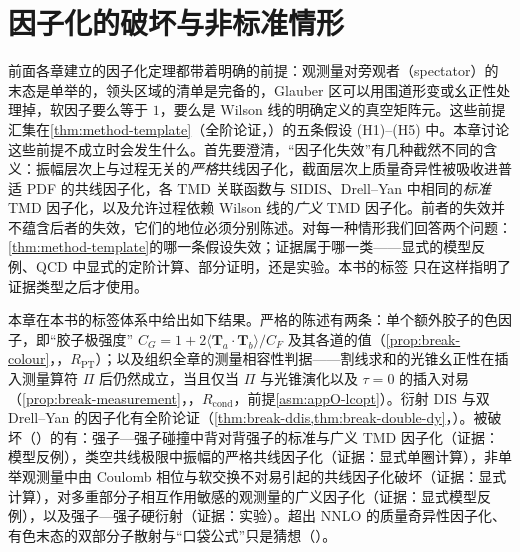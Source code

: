 \chapter{因子化的破坏与非标准情形}\label{ch:break}

前面各章建立的因子化定理都带着明确的前提：观测量对旁观者（spectator）的末态是单举的，领头区域的清单是完备的，Glauber 区可以用围道形变或幺正性处理掉，软因子要么等于 $1$，要么是 Wilson 线的明确定义的真空矩阵元。这些前提汇集在\cref{thm:method-template}（全阶论证，\tagA）的五条假设 (H1)--(H5) 中。本章讨论这些前提不成立时会发生什么。首先要澄清，“因子化失效”有几种截然不同的含义：振幅层次上与过程无关的\emph{严格}共线因子化，截面层次上质量奇异性被吸收进普适 PDF 的共线因子化，各 TMD 关联函数与 SIDIS、Drell--Yan 中相同的\emph{标准} TMD 因子化，以及允许过程依赖 Wilson 线的\emph{广义} TMD 因子化。前者的失效并不蕴含后者的失效，它们的地位必须分别陈述。对每一种情形我们回答两个问题：\cref{thm:method-template}的哪一条假设失效；证据属于哪一类——显式的模型反例、QCD 中显式的定阶计算、部分证明，还是实验。本书的标签 \tagV 只在这样指明了证据类型之后才使用。

本章在本书的标签体系中给出如下结果。严格的陈述有两条：单个额外胶子的色因子，即“胶子极强度” $C_G=1+2\langle\mathbf T_a\cdot\mathbf T_b\rangle/C_F$ 及其各道的值（\cref{prop:break-colour}，\tagR，$R_{\mathrm{PT}}$）；以及组织全章的测量相容性判据——割线求和的光锥幺正性在插入测量算符 $\Pi$ 后仍然成立，当且仅当 $\Pi$ 与光锥演化以及 $\tau=0$ 的插入对易（\cref{prop:break-measurement}，\tagR，$R_{\mathrm{cond}}$，前提\cref{asm:appO-lcopt}）。衍射 DIS 与双 Drell--Yan 的因子化有全阶论证（\cref{thm:break-ddis,thm:break-double-dy}，\tagA）。被破坏（\tagV）的有：强子—强子碰撞中背对背强子的标准与广义 TMD 因子化（证据：模型反例），类空共线极限中振幅的严格共线因子化（证据：显式单圈计算），非单举观测量中由 Coulomb 相位与软交换不对易引起的共线因子化破坏（证据：显式计算），对多重部分子相互作用敏感的观测量的广义因子化（证据：显式模型反例），以及强子—强子硬衍射（证据：实验）。超出 NNLO 的质量奇异性因子化、有色末态的双部分子散射与“口袋公式”只是猜想（\tagC）。

